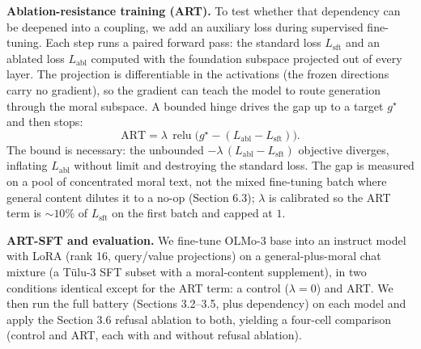 \textbf{Ablation-resistance training (ART).} To test whether that dependency can be
deepened into a coupling, we add an auxiliary loss during supervised fine-tuning.
Each step runs a paired forward pass: the standard loss \(L_{\text{sft}}\) and an
ablated loss \(L_{\text{abl}}\) computed with the foundation subspace projected out
of every layer. The projection is differentiable in the activations (the frozen
directions carry no gradient), so the gradient can teach the model to route
generation through the moral subspace. A bounded hinge drives the gap up to a
target \(g^\star\) and then stops:
\[\text{ART} = \lambda\,\operatorname{relu}\!\big(g^\star - (L_{\text{abl}} - L_{\text{sft}})\big).\]
The bound is necessary: the unbounded \(-\lambda\,(L_{\text{abl}}-L_{\text{sft}})\)
objective diverges, inflating \(L_{\text{abl}}\) without limit and destroying the
standard loss. The gap is measured on a pool of concentrated moral text, not the
mixed fine-tuning batch where general content dilutes it to a no-op
(Section 6.3); \(\lambda\) is calibrated so the ART term is \({\sim}10\%\) of
\(L_{\text{sft}}\) on the first batch and capped at \(1\).

\textbf{ART-SFT and evaluation.} We fine-tune OLMo-3 base into an instruct model with
LoRA (rank 16, query/value projections) on a general-plus-moral chat mixture (a
Tülu-3 SFT subset with a moral-content supplement), in two conditions identical
except for the ART term: a control (\(\lambda=0\)) and ART. We then run the full
battery (Sections 3.2--3.5, plus dependency) on each model and apply the
Section 3.6 refusal ablation to both, yielding a four-cell comparison (control
and ART, each with and without refusal ablation).
